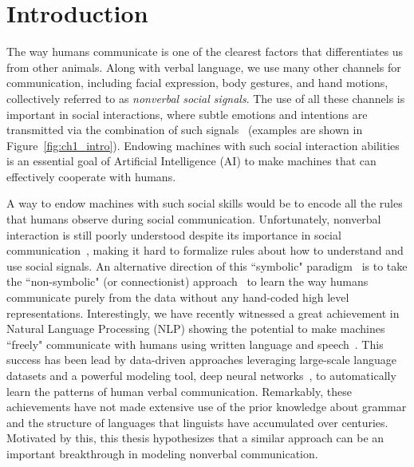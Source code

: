 
%
%	

\chapter{Introduction}
The way humans communicate is one of the clearest factors that differentiates us from other animals. Along with verbal language, we use many other channels for communication, including facial expression, body gestures, and hand motions, collectively referred to as \emph{nonverbal social signals}. The use of all these channels is important in social interactions, where subtle emotions and intentions are transmitted via the combination of such signals~\cite{Moore13} (examples are shown in Figure~\ref{fig:ch1_intro}). Endowing machines with such social interaction abilities is an essential goal of Artificial Intelligence (AI) to make machines that can effectively cooperate with humans.%


A way to endow machines with such social skills would be to encode all the rules that humans observe during social communication. Unfortunately, nonverbal interaction is still poorly understood despite its importance in social communication~\cite{Mehrabian67,Mehrabian81,Birdwhistell-1970}, making it hard to formalize rules about how to understand and use social signals. An alternative direction of this ``symbolic" paradigm~\cite{newell1976} is to take the ``non-symbolic" (or connectionist) approach~\cite{rumelhart1986parallel} to learn the way humans communicate purely from the data without any hand-coded high level representations. Interestingly, we have recently witnessed a great achievement in Natural Language Processing (NLP) showing the potential to make machines ``freely" communicate with humans using written language and speech~\cite{young2018recent}. This success has been lead by data-driven approaches leveraging large-scale language datasets and a powerful modeling tool, deep neural networks~\cite{lecun2015deep}, to automatically learn the patterns of human verbal communication. Remarkably, these achievements have not made extensive use of the prior knowledge about grammar and the structure of languages that linguists have accumulated over centuries. Motivated by this, this thesis hypothesizes that a similar approach can be an important breakthrough in modeling nonverbal communication. 



